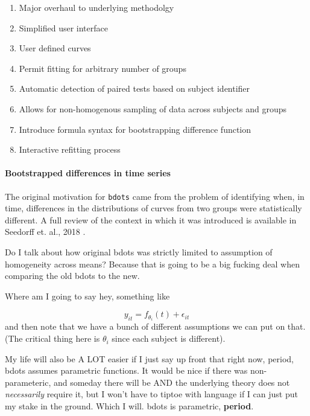 \documentclass{article}
\newcommand{\xt}{\texttt}%
\begin{document}
\begin{singlespace}
\begin{enumerate}
\item Major overhaul to underlying methodolgy 
\item Simplified user interface
\item User defined curves
\item Permit fitting for arbitrary number of groups
\item Automatic detection of paired tests based on subject identifier
\item Allows for non-homogenous sampling of data across subjects and groups
\item Introduce formula syntax for bootstrapping difference function
\item Interactive refitting process
\end{enumerate}
\end{singlespace}

\paragraph{Bootstrapped differences in time series}

The original motivation for \xt{bdots} came from the problem of identifying when, in time, differences in the distributions of curves from two groups were statistically different. A full review of the context in which it was introduced is available in Seedorff et. al., 2018 \cite{seedorff2018bdots}.

Do I talk about how original bdots was strictly limited to assumption of homogeneity across means? Because that is going to be a big fucking deal when comparing the old bdots to the new.

Where am I going to say hey, something like

\begin{equation}
y_{it} = f_{\theta_i}(t) + \epsilon_{it}
\end{equation}
and then note that we have a bunch of different assumptions we can put on that. (The critical thing here is $\theta_i$ since each subject is different).

My life will also be A LOT easier if I just  say up front that right now, period, bdots assumes parametric functions. It would be nice if there was non-parameteric, and someday there will be AND the underlying theory does not \textit{necessarily} require it, but I won't have to tiptoe with language if I can just put my stake in the ground. Which I will. bdots is parametric, \textbf{period}.
\end{document}
